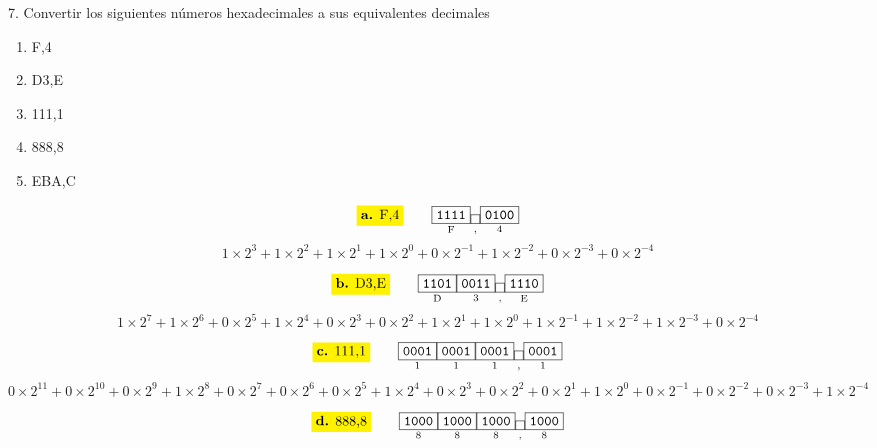 \documentclass[a4paper,12pt]{article}
\begin{document}
	7. Convertir los siguientes números hexadecimales a sus equivalentes
	decimales
	\begin{enumerate} 
		\item F,4 
		\item D3,E 
		\item 111,1 
		\item 888,8 
		\item EBA,C
	\end{enumerate}	
	\[
	\mathtt{
		\colorbox{yellow}{\textbf{a.} F,4} \qquad
		\underset{\text{F}}{\boxed{\mathtt{1111}}}
		\underset{\text{,}}{\boxed{\mathtt{}}}
		\underset{\text{4}}{\boxed{\mathtt{0100}}}
	}	
	\]
	\[
	 1\times2^{3} + 1\times2^{2} + 1\times2^{1} + 1\times2^{0} + 0\times2^{-1} + 1\times2^{-2} + 0\times2^{-3} + 0\times2^{-4}
	\]
	\begin{center}
	\end{center}
	\[
	\mathtt{
		\colorbox{yellow}{\textbf{b.} D3,E} \qquad
		\underset{\text{D}}{\boxed{\mathtt{1101}}}
		\underset{\text{3}}{\boxed{\mathtt{0011}}}
		\underset{\text{,}}{\boxed{\mathtt{}}}
		\underset{\text{E}}{\boxed{\mathtt{1110}}}
	}	
	\]
	\[
	1\times2^{7} + 1\times2^{6} + 0\times2^{5} + 1\times2^{4} + 0\times2^{3} + 0\times2^{2} + 1\times2^{1} + 1\times2^{0} + 1\times2^{-1} + 1\times2^{-2} + 1\times2^{-3} + 0\times2^{-4}
	\]
	\begin{center}
	\end{center}
	\[
	\mathtt{
		\colorbox{yellow}{\textbf{c.} 111,1} \qquad
		\underset{\text{1}}{\boxed{\mathtt{0001}}}
		\underset{\text{1}}{\boxed{\mathtt{0001}}}
		\underset{\text{1}}{\boxed{\mathtt{0001}}}
		\underset{\text{,}}{\boxed{\mathtt{}}}
		\underset{\text{1}}{\boxed{\mathtt{0001}}}
	}	
	\]
	\[
    0\times2^{11} + 0\times2^{10} + 0\times2^{9} + 1\times2^{8} + 0\times2^{7} + 0\times2^{6} + 0\times2^{5} + 1\times2^{4} + 0\times2^{3} + 0\times2^{2} + 0\times2^{1} + 1\times2^{0} + 0\times2^{-1} + 0\times2^{-2} + 0\times2^{-3} + 1\times2^{-4}
	\]
	\begin{center}
	\end{center}
	\[
	\mathtt{
		\colorbox{yellow}{\textbf{d.} 888,8} \qquad
		\underset{\text{8}}{\boxed{\mathtt{1000}}}
		\underset{\text{8}}{\boxed{\mathtt{1000}}}
		\underset{\text{8}}{\boxed{\mathtt{1000}}}
		\underset{\text{,}}{\boxed{\mathtt{}}}
		\underset{\text{8}}{\boxed{\mathtt{1000}}}
	}	
	\]
\end{document}

